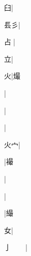 \begin{multicols}{2}
{{\cjk{}{\cnsym{}　}{\cnsym{}　}臼}|{}\par
{\cjk{}{\cnsym{}　}镸彡}|{}\par
{\cjk{}{\cnsym{}　}占{\cnxb{}𠂭}}|{}\par
{\cjk{}{\cnsym{}　}{\cnsym{}　}立}|{}\par
{\cjk{}{\cnsym{}　}{\cnsym{}　}火}|{\cjk{}熶}\par
{}|{}\par
{}|{}\par
{}|{}\par
{\cjk{}{\cnsym{}　}火{宀}}|{}\par
{}|{\cjk{}襊}\par
{}|{}\par
{}|{}\par
{}|{\cjk{}繓}\par
{\cjk{}{\cnsym{}　}{\cnsym{}　}女}|{}\par
{\cjk{}亅{\cnsym{}　}{\cnsym{}　}}|{}\par
}
\end{multicols}
